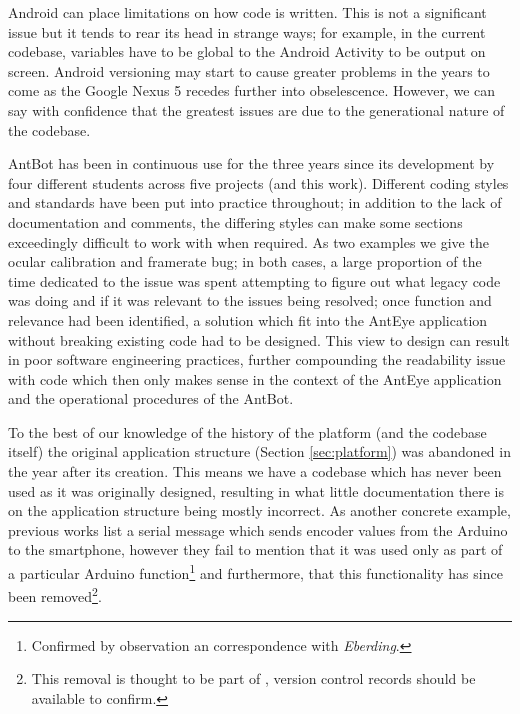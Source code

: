\documentclass[a4paper,11pt,twoside,openright]{article}
\begin{document}
Android can place limitations on how code is written. This is not a
significant issue but it tends to rear its head in strange ways; for
example, in the current codebase, variables have to be global to the
Android Activity to be output on screen. Android versioning may start
to cause greater problems in the years to come as the Google Nexus 5
recedes further into obselescence. However, we can say with confidence
that the greatest issues are due to the generational nature of the
codebase.
\newline\par

AntBot has been in continuous use for the three years since its
development by four different students across five projects
\cite{Eberding2016,Scimeca2017,Zhang2017,Mitchell2018} (and this
work). Different coding styles and standards have been put into
practice throughout; in addition to the lack of documentation and
comments, the differing styles can make some sections exceedingly
difficult to work with when required. As two examples we give the
ocular calibration and framerate bug; in both cases, a large
proportion of the time dedicated to the issue was spent attempting to
figure out what legacy code was doing and if it was relevant to the
issues being resolved; once function and relevance had been
identified, a solution which fit into the AntEye application without
breaking existing code had to be designed. This view to design can
result in poor software engineering practices, further compounding the
readability issue with code which then only makes sense in the context
of the AntEye application and the operational procedures of the
AntBot.
\newline\par

To the best of our knowledge of the history of the platform (and the
codebase itself) the original application structure (Section
\ref{sec:platform}) was abandoned in the year after its creation.
This means we have a codebase which has never been used as it was
originally designed, resulting in what little documentation there is
on the application structure being mostly incorrect. As another
concrete example, previous works \cite{Eberding2016, Scimeca2017,
  Zhang2017} list a serial message which sends encoder values from the
Arduino to the smartphone, however they fail to mention that it was
used only as part of a particular Arduino function\footnote{Confirmed
  by observation an correspondence with \textit{Eberding}.} and furthermore,
that this functionality has since been removed\footnote{This removal is
thought to be part of \cite{Scimeca2017}, version control records
should be available to confirm.}.
\newline\par
\end{document}
